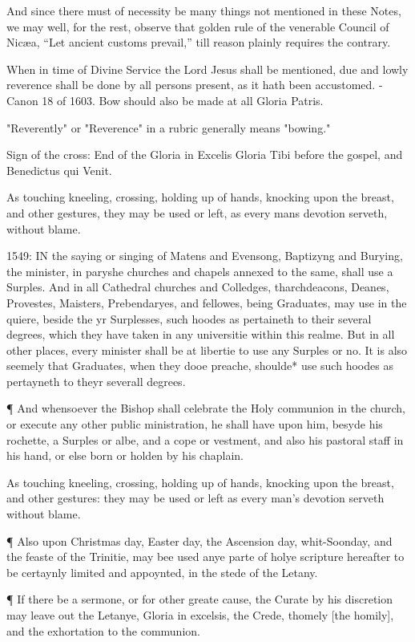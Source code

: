 
And since there must of necessity be many things not mentioned in these Notes, we may well, for the rest, observe that golden rule of the venerable Council of Nicæa, “Let ancient customs prevail,” till reason plainly requires the contrary.


\fleuron

When in time of Divine Service the Lord Jesus shall be mentioned, due and lowly reverence shall be done by all persons present, as it hath been accustomed. - Canon 18 of 1603.
Bow should also be made at all Gloria Patris.

"Reverently" or "Reverence" in a rubric generally means "bowing."

Sign of the cross:
End of the Gloria in Excelis
Gloria Tibi before the gospel, and
Benedictus qui Venit.

As touching kneeling, crossing, holding up of hands, knocking upon the breast, and other gestures, they may be used or left, as every mans devotion serveth, without blame.


1549:
IN the saying or singing of Matens and Evensong, Baptizyng and Burying, the minister, in paryshe churches and chapels annexed to the same, shall use a Surples. And in all Cathedral churches and Colledges, tharchdeacons, Deanes, Provestes, Maisters, Prebendaryes, and fellowes, being Graduates, may use in the quiere, beside the yr Surplesses, such hoodes as pertaineth to their several degrees, which they have taken in any universitie within this realme. But in all other places, every minister shall be at libertie to use any Surples or no. It is also seemely that Graduates, when they dooe preache, shoulde* use such hoodes as pertayneth to theyr severall degrees.
 
 
 
¶ And whensoever the Bishop shall celebrate the Holy communion in the church, or execute any other public ministration, he shall have upon him, besyde his rochette, a Surples or albe, and a cope or vestment, and also his pastoral staff in his hand, or else born or holden by his chaplain.

As touching kneeling, crossing, holding up of hands, knocking upon the breast, and other gestures: they may be used or left as every man’s devotion serveth without blame.

¶ Also upon Christmas day, Easter day, the Ascension day, whit-Soonday, and the feaste of the Trinitie, may bee used anye parte of holye scripture hereafter to be certaynly limited and appoynted, in the stede of the Letany.

¶ If there be a sermone, or for other greate cause, the Curate by his discretion may leave out the Letanye, Gloria in excelsis, the Crede, thomely [the homily], and the exhortation to the communion.
